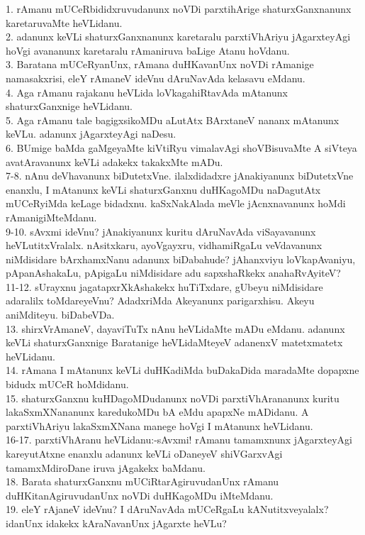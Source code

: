 \documentclass{article}
\begin{document}
1. rAmanu mUCeRbididxruvudanunx noVDi parxtihArige shaturxGanxnanunx karetaruvaMte heVLidanu.\\
2. adanunx keVLi shaturxGanxnanunx karetaralu parxtiVhAriyu jAgarxteyAgi hoVgi avananunx karetaralu rAmaniruva baLige Atanu hoVdanu.\\
3. Baratana mUCeRyanUnx, rAmana duHKavanUnx noVDi rAmanige namasakxrisi, eleY rAmaneV ideVnu dAruNavAda kelasavu eMdanu.\\
4. Aga rAmanu rajakanu heVLida loVkagahiRtavAda mAtanunx shaturxGanxnige heVLidanu.\\
5. Aga rAmanu tale bagigxsikoMDu aLutAtx BArxtaneV nananx mAtanunx keVLu. adanunx jAgarxteyAgi naDesu.\\
6. BUmige baMda gaMgeyaMte kiVtiRyu vimalavAgi shoVBisuvaMte A siVteya avatAravanunx keVLi adakekx takakxMte mADu.\\
7-8. nAnu deVhavanunx biDutetxVne. ilalxdidadxre jAnakiyanunx biDutetxVne enanxlu, I mAtanunx keVLi shaturxGanxnu duHKagoMDu naDagutAtx mUCeRyiMda keLage bidadxnu. kaSxNakAlada meVle jAcnxnavanunx hoMdi rAmanigiMteMdanu.\\
9-10. sAvxmi ideVnu? jAnakiyanunx kuritu dAruNavAda viSayavanunx heVLutitxVralalx. nAsitxkaru, ayoVgayxru, vidhamiRgaLu veVdavanunx niMdisidare bArxhamxNanu adanunx biDabahude? jAhanxviyu loVkapAvaniyu, pApanAshakaLu, pApigaLu niMdisidare adu sapxshaRkekx anahaRvAyiteV?\\
11-12. sUrayxnu jagatapxrXkAshakekx huTiTxdare, gUbeyu niMdisidare adaralilx toMdareyeVnu? AdadxriMda Akeyanunx parigarxhisu. Akeyu aniMditeyu. biDabeVDa.\\
13. shirxVrAmaneV, dayaviTuTx nAnu heVLidaMte mADu eMdanu. adanunx keVLi shaturxGanxnige Baratanige heVLidaMteyeV adanenxV matetxmatetx heVLidanu.\\
14. rAmana I mAtanunx keVLi duHKadiMda buDakaDida maradaMte dopapxne bidudx mUCeR hoMdidanu.\\
15. shaturxGanxnu kuHDagoMDudanunx noVDi parxtiVhArananunx kuritu lakaSxmXNananunx karedukoMDu bA eMdu apapxNe mADidanu. A parxtiVhAriyu lakaSxmXNana manege hoVgi I mAtanunx heVLidanu.\\
16-17. parxtiVhAranu heVLidanu:-sAvxmi! rAmanu tamamxnunx jAgarxteyAgi kareyutAtxne enanxlu adanunx keVLi oDaneyeV shiVGarxvAgi tamamxMdiroDane iruva jAgakekx baMdanu.\\
18. Barata shaturxGanxnu mUCiRtarAgiruvudanUnx rAmanu duHKitanAgiruvudanUnx noVDi duHKagoMDu iMteMdanu.\\
19. eleY rAjaneV ideVnu? I dAruNavAda mUCeRgaLu kANutitxveyalalx? idanUnx idakekx kAraNavanUnx jAgarxte heVLu?\\
\end{document}
